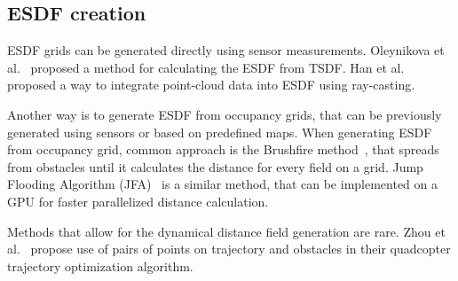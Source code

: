 \documentclass[letterpaper, 10 pt, conference]{ieeeconf}  %
\begin{document}
%

\subsection{ESDF creation}

ESDF grids can be generated directly using sensor measurements. Oleynikova et al.~\cite{oleynikova2017voxblox} proposed a method for calculating the ESDF from TSDF. Han et al.~\cite{han2019fiesta} proposed a way to integrate point-cloud data into ESDF using ray-casting.  

Another way is to generate ESDF from occupancy grids, that can be previously generated using sensors or based on predefined maps. When generating ESDF from occupancy grid, common approach is the Brushfire method~\cite{lau2010improved}, that spreads from obstacles until it calculates the distance for every field on a grid. Jump Flooding Algorithm (JFA)~\cite{rong2006jump} is a similar method, that can be implemented on a GPU for faster parallelized distance calculation.  

Methods that allow for the dynamical distance field generation are rare. Zhou et al.~\cite{zhou2021egoplanner} propose use of pairs of points on trajectory and obstacles in their quadcopter trajectory optimization algorithm.

\end{document}
